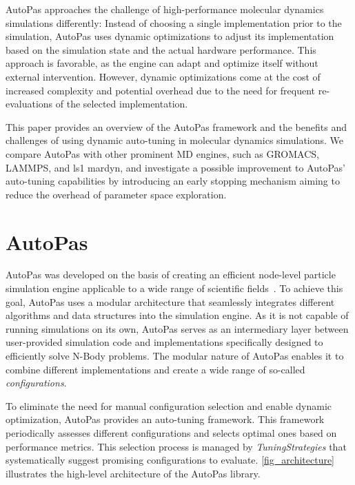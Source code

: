 \documentclass[conference]{IEEEtran}
\begin{document}
AutoPas approaches the challenge of high-performance molecular dynamics simulations differently: Instead of choosing a single implementation prior to the simulation, AutoPas uses dynamic optimizations to adjust its implementation based on the simulation state and the actual hardware performance. This approach is favorable, as the engine can adapt and optimize itself without external intervention. However, dynamic optimizations come at the cost of increased complexity and potential overhead due to the need for frequent re-evaluations of the selected implementation.

This paper provides an overview of the AutoPas framework and the benefits and challenges of using dynamic auto-tuning in molecular dynamics simulations. We compare AutoPas with other prominent MD engines, such as GROMACS, LAMMPS, and ls1 mardyn, and investigate a possible improvement to AutoPas' auto-tuning capabilities by introducing an early stopping mechanism aiming to reduce the overhead of parameter space exploration.

\section{AutoPas}

AutoPas was developed on the basis of creating an efficient node-level particle simulation engine applicable to a wide range of scientific fields~\cite{Tchipev2020}. To achieve this goal, AutoPas uses a modular architecture that seamlessly integrates different algorithms and data structures into the simulation engine. As it is not capable of running simulations on its own, AutoPas serves as an intermediary layer between user-provided simulation code and implementations specifically designed to efficiently solve N-Body problems. The modular nature of AutoPas enables it to combine different implementations and create a wide range of so-called \textit{configurations}.

To eliminate the need for manual configuration selection and enable dynamic optimization, AutoPas provides an auto-tuning framework. This framework periodically assesses different configurations and selects optimal ones based on performance metrics. This selection process is managed by \textit{TuningStrategies} that systematically suggest promising configurations to evaluate. \autoref{fig_architecture} illustrates the high-level architecture of the AutoPas library.
\end{document}
